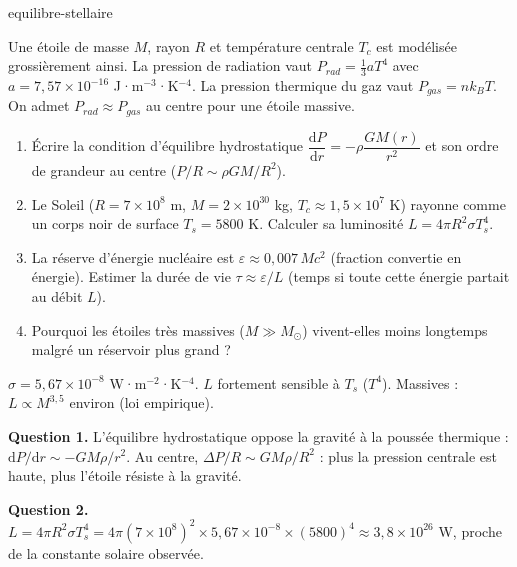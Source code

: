 \begin{exo}{equilibre-stellaire}

Une étoile de masse $M$, rayon $R$ et température centrale $T_c$ est modélisée grossièrement ainsi. La pression de radiation vaut $P_{rad} = \tfrac{1}{3}a T^4$ avec $a = 7{,}57\times10^{-16}$ J·m$^{-3}$·K$^{-4}$. La pression thermique du gaz vaut $P_{gas} = n k_B T$. On admet $P_{rad} \approx P_{gas}$ au centre pour une étoile massive.

\begin{enumerate}
\item Écrire la condition d'équilibre hydrostatique $\dfrac{\mathrm{d}P}{\mathrm{d}r} = -\rho \dfrac{GM(r)}{r^2}$ et son ordre de grandeur au centre ($P/R \sim \rho GM/R^2$).
\item Le Soleil ($R = 7\times10^8$ m, $M = 2\times10^{30}$ kg, $T_c \approx 1{,}5\times10^7$ K) rayonne comme un corps noir de surface $T_s = 5800$ K. Calculer sa luminosité $L = 4\pi R^2 \sigma T_s^4$.
\item La réserve d'énergie nucléaire est $\varepsilon \approx 0{,}007\,Mc^2$ (fraction convertie en énergie). Estimer la durée de vie $\tau \approx \varepsilon/L$ (temps si toute cette énergie partait au débit $L$).
\item Pourquoi les étoiles très massives ($M \gg M_\odot$) vivent-elles moins longtemps malgré un réservoir plus grand ?
\end{enumerate}

\begin{indication}
$\sigma = 5{,}67\times10^{-8}$ W·m$^{-2}$·K$^{-4}$. $L$ fortement sensible à $T_s$ ($T^4$). Massives : $L \propto M^{3{,}5}$ environ (loi empirique).
\end{indication}

\begin{solution}
\textbf{Question 1.} L'équilibre hydrostatique oppose la gravité à la poussée thermique : $\mathrm{d}P/\mathrm{d}r \sim -GM\rho/r^2$. Au centre, $\Delta P/R \sim GM\rho/R^2$ : plus la pression centrale est haute, plus l'étoile résiste à la gravité.

\textbf{Question 2.} $L = 4\pi R^2 \sigma T_s^4 = 4\pi (7\times10^8)^2 \times 5{,}67\times10^{-8} \times (5800)^4 \approx 3{,}8\times10^{26}$ W, proche de la constante solaire observée.


\end{solution}
\end{exo}
